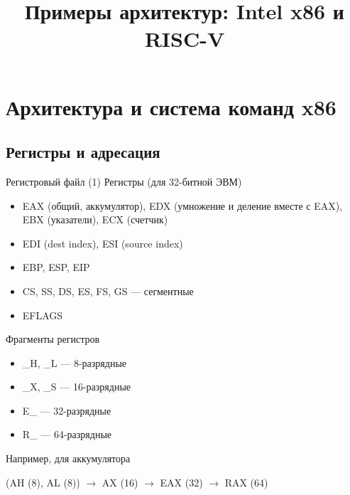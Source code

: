 \documentclass[xetex,aspectratio=43]{beamer}
\title{Примеры архитектур: Intel x86 и RISC-V}
\begin{document}
    \titleslide

    \tocslide



\section{Архитектура и система команд x86}

\subsection{Регистры и адресация}

\begin{frame}{Регистровый файл (1)}
        Регистры (для 32-битной ЭВМ)

        \begin{itemize}
            \tightlist
            \item
            EAX (общий, аккумулятор), EDX (умножение и деление вместе с EAX), EBX
            (указатели), ECX (счетчик)
            \item
            EDI (dest index), ESI (source index)
            \item
            EBP, ESP, EIP
            \item
            CS, SS, DS, ES, FS, GS --- сегментные
            \item
            EFLAGS
        \end{itemize}

        \pause

        Фрагменты регистров

        \begin{itemize}
            \tightlist
            \item
            \_H, \_L --- 8-разрядные
            \item
            \_X, \_S --- 16-разрядные
            \item
            E\_ --- 32-разрядные
            \item
            R\_ --- 64-разрядные
        \end{itemize}

        Например, для аккумулятора

        (AH (8), AL (8)) $\rightarrow$ AX (16) $\rightarrow$ EAX (32) $\rightarrow$ RAX (64)
\end{frame}
\end{document}
